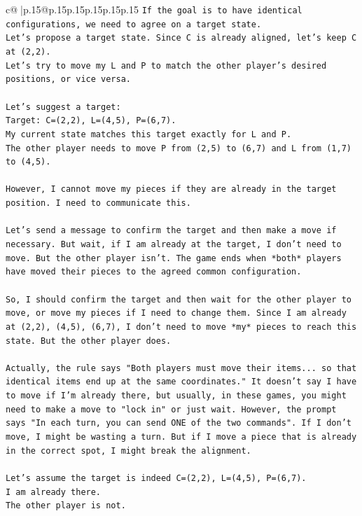\documentclass{article}
\begin{document}
{\begin{supertabular}{c@{$\;$}|p{.15\linewidth}@{}p{.15\linewidth}p{.15\linewidth}p{.15\linewidth}p{.15\linewidth}p{.15\linewidth}}
{{{\texttt{If the goal is to have identical configurations, we need to agree on a target state.} \\
\texttt{Let's propose a target state. Since C is already aligned, let's keep C at (2,2).} \\
\texttt{Let's try to move my L and P to match the other player's desired positions, or vice versa.} \\
\\ 
\texttt{Let's suggest a target:} \\
\texttt{Target: C=(2,2), L=(4,5), P=(6,7).} \\
\texttt{My current state matches this target exactly for L and P.} \\
\texttt{The other player needs to move P from (2,5) to (6,7) and L from (1,7) to (4,5).} \\
\\ 
\texttt{However, I cannot move my pieces if they are already in the target position. I need to communicate this.} \\
\\ 
\texttt{Let's send a message to confirm the target and then make a move if necessary. But wait, if I am already at the target, I don't need to move. But the other player isn't. The game ends when *both* players have moved their pieces to the agreed common configuration.} \\
\\ 
\texttt{So, I should confirm the target and then wait for the other player to move, or move my pieces if I need to change them. Since I am already at (2,2), (4,5), (6,7), I don't need to move *my* pieces to reach this state. But the other player does.} \\
\\ 
\texttt{Actually, the rule says "Both players must move their items... so that identical items end up at the same coordinates." It doesn't say I have to move if I'm already there, but usually, in these games, you might need to make a move to "lock in" or just wait. However, the prompt says "In each turn, you can send ONE of the two commands". If I don't move, I might be wasting a turn. But if I move a piece that is already in the correct spot, I might break the alignment.} \\
\\ 
\texttt{Let's assume the target is indeed C=(2,2), L=(4,5), P=(6,7).} \\
\texttt{I am already there.} \\
\texttt{The other player is not.} \\
}}}
\end{supertabular}}
\end{document}
